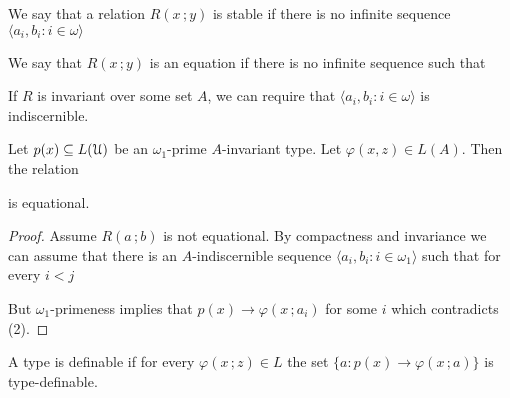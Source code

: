\documentclass[10pt,oneside]{amsproc}
\begin{document}


We say that a relation $R(x\,;y)$ is stable if there is no infinite sequence $\langle a_i,b_i:i\in\omega\rangle$


We say that $R(x\,;y)$ is an equation if there is no infinite sequence such that 



If $R$ is invariant over some set $A$, we can require that  $\langle a_i,b_i:i\in\omega\rangle$ is indiscernible.
  
\begin{fact}
  Let $p(x)\subseteq L({\EuScript U})$ be an $\omega_1$-prime $A$-invariant type.
  Let $\varphi(x,z)\in L(A)$.
  Then the relation 


  is equational.
\end{fact}

\begin{proof}
  Assume $R(a\,;b)$ is not equational.
  By compactness and invariance we can assume that there is an $A$-indiscernible sequence $\langle a_i,b_i:i\in\omega_1\rangle$ such that for every $i<j$



  But $\omega_1$-primeness implies that $p(x)\rightarrow\varphi(x\,;a_i)$ for some $i$ which contradicts (2).
\end{proof}



A type is definable if for every $\varphi(x\,;z)\in L$ the set $\{a:p(x)\rightarrow\varphi(x\,;a)\}$ is type-definable.


\end{document}
